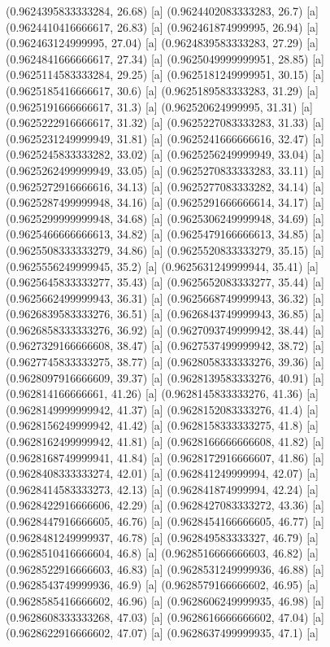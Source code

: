 {{{(0.9624395833333284, 26.68) [a] 
(0.9624402083333283, 26.7) [a] 
(0.9624410416666617, 26.83) [a] 
(0.962461874999995, 26.94) [a] 
(0.962463124999995, 27.04) [a] 
(0.9624839583333283, 27.29) [a] 
(0.9624841666666617, 27.34) [a] 
(0.9625049999999951, 28.85) [a] 
(0.9625114583333284, 29.25) [a] 
(0.9625181249999951, 30.15) [a] 
(0.9625185416666617, 30.6) [a] 
(0.9625189583333283, 31.29) [a] 
(0.9625191666666617, 31.3) [a] 
(0.962520624999995, 31.31) [a] 
(0.9625222916666617, 31.32) [a] 
(0.9625227083333283, 31.33) [a] 
(0.9625231249999949, 31.81) [a] 
(0.9625241666666616, 32.47) [a] 
(0.9625245833333282, 33.02) [a] 
(0.9625256249999949, 33.04) [a] 
(0.9625262499999949, 33.05) [a] 
(0.9625270833333283, 33.11) [a] 
(0.9625272916666616, 34.13) [a] 
(0.9625277083333282, 34.14) [a] 
(0.9625287499999948, 34.16) [a] 
(0.9625291666666614, 34.17) [a] 
(0.9625299999999948, 34.68) [a] 
(0.9625306249999948, 34.69) [a] 
(0.9625466666666613, 34.82) [a] 
(0.9625479166666613, 34.85) [a] 
(0.9625508333333279, 34.86) [a] 
(0.9625520833333279, 35.15) [a] 
(0.9625556249999945, 35.2) [a] 
(0.9625631249999944, 35.41) [a] 
(0.9625645833333277, 35.43) [a] 
(0.9625652083333277, 35.44) [a] 
(0.9625662499999943, 36.31) [a] 
(0.9625668749999943, 36.32) [a] 
(0.9626839583333276, 36.51) [a] 
(0.9626843749999943, 36.85) [a] 
(0.9626858333333276, 36.92) [a] 
(0.9627093749999942, 38.44) [a] 
(0.9627329166666608, 38.47) [a] 
(0.9627537499999942, 38.72) [a] 
(0.9627745833333275, 38.77) [a] 
(0.9628058333333276, 39.36) [a] 
(0.9628097916666609, 39.37) [a] 
(0.9628139583333276, 40.91) [a] 
(0.962814166666661, 41.26) [a] 
(0.9628145833333276, 41.36) [a] 
(0.9628149999999942, 41.37) [a] 
(0.9628152083333276, 41.4) [a] 
(0.9628156249999942, 41.42) [a] 
(0.9628158333333275, 41.8) [a] 
(0.9628162499999942, 41.81) [a] 
(0.9628166666666608, 41.82) [a] 
(0.9628168749999941, 41.84) [a] 
(0.9628172916666607, 41.86) [a] 
(0.9628408333333274, 42.01) [a] 
(0.962841249999994, 42.07) [a] 
(0.9628414583333273, 42.13) [a] 
(0.962841874999994, 42.24) [a] 
(0.9628422916666606, 42.29) [a] 
(0.9628427083333272, 43.36) [a] 
(0.9628447916666605, 46.76) [a] 
(0.9628454166666605, 46.77) [a] 
(0.9628481249999937, 46.78) [a] 
(0.962849583333327, 46.79) [a] 
(0.9628510416666604, 46.8) [a] 
(0.9628516666666603, 46.82) [a] 
(0.9628522916666603, 46.83) [a] 
(0.9628531249999936, 46.88) [a] 
(0.9628543749999936, 46.9) [a] 
(0.9628579166666602, 46.95) [a] 
(0.9628585416666602, 46.96) [a] 
(0.9628606249999935, 46.98) [a] 
(0.9628608333333268, 47.03) [a] 
(0.9628616666666602, 47.04) [a] 
(0.9628622916666602, 47.07) [a] 
(0.9628637499999935, 47.1) [a] 
}}}

